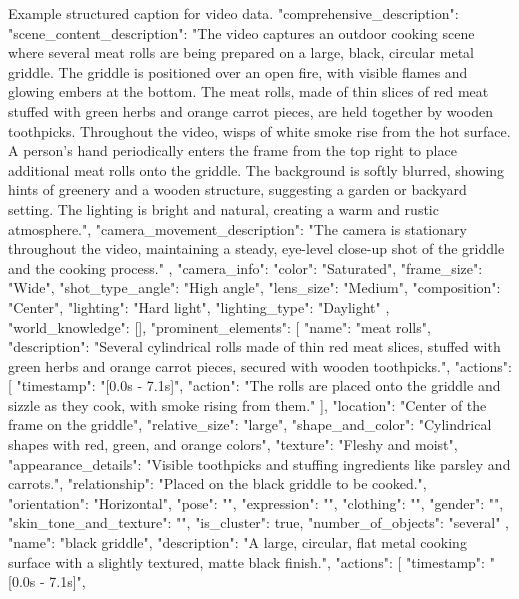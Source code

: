 \begin{captionexample}{Example structured caption for video data.}
{
  "comprehensive_description": {
    "scene_content_description": "The video captures an outdoor cooking scene where several meat rolls are being prepared on a large, black, circular metal griddle. The griddle is positioned over an open fire, with visible flames and glowing embers at the bottom. The meat rolls, made of thin slices of red meat stuffed with green herbs and orange carrot pieces, are held together by wooden toothpicks. Throughout the video, wisps of white smoke rise from the hot surface. A person's hand periodically enters the frame from the top right to place additional meat rolls onto the griddle. The background is softly blurred, showing hints of greenery and a wooden structure, suggesting a garden or backyard setting. The lighting is bright and natural, creating a warm and rustic atmosphere.",
    "camera_movement_description": "The camera is stationary throughout the video, maintaining a steady, eye-level close-up shot of the griddle and the cooking process."
  },
  "camera_info": {
    "color": "Saturated",
    "frame_size": "Wide",
    "shot_type_angle": "High angle",
    "lens_size": "Medium",
    "composition": "Center",
    "lighting": "Hard light",
    "lighting_type": "Daylight"
  },
  "world_knowledge": [],
  "prominent_elements": [
    {
      "name": "meat rolls",
      "description": "Several cylindrical rolls made of thin red meat slices, stuffed with green herbs and orange carrot pieces, secured with wooden toothpicks.",
      "actions": [
        {
          "timestamp": "[0.0s - 7.1s]",
          "action": "The rolls are placed onto the griddle and sizzle as they cook, with smoke rising from them."
        }
      ],
      "location": "Center of the frame on the griddle",
      "relative_size": "large",
      "shape_and_color": "Cylindrical shapes with red, green, and orange colors",
      "texture": "Fleshy and moist",
      "appearance_details": "Visible toothpicks and stuffing ingredients like parsley and carrots.",
      "relationship": "Placed on the black griddle to be cooked.",
      "orientation": "Horizontal",
      "pose": "",
      "expression": "",
      "clothing": "",
      "gender": "",
      "skin_tone_and_texture": "",
      "is_cluster": true,
      "number_of_objects": "several"
    },
    {
      "name": "black griddle",
      "description": "A large, circular, flat metal cooking surface with a slightly textured, matte black finish.",
      "actions": [
        {
          "timestamp": "[0.0s - 7.1s]",
}}}
\end{captionexample}
